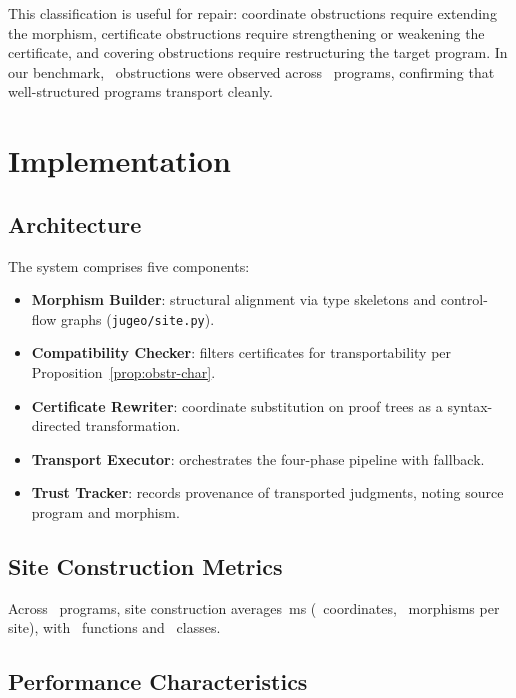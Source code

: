 \documentclass[11pt]{article}
\begin{document}
This classification is useful for repair: coordinate obstructions
require extending the morphism, certificate obstructions require
strengthening or weakening the certificate, and covering obstructions
require restructuring the target program.  In our benchmark,
\compObstructionTotal\ obstructions were observed across
\compTotalPrograms\ programs, confirming that well-structured
programs transport cleanly.

\section{Implementation}\label{sec:implementation}

\subsection{Architecture}
The system comprises five components:
\begin{itemize}[noitemsep]
  \item \textbf{Morphism Builder}: structural alignment via type
        skeletons and control-flow graphs (\texttt{jugeo/site.py}).
  \item \textbf{Compatibility Checker}: filters certificates for
        transportability per Proposition~\ref{prop:obstr-char}.
  \item \textbf{Certificate Rewriter}: coordinate substitution on
        proof trees as a syntax-directed transformation.
  \item \textbf{Transport Executor}: orchestrates the four-phase
        pipeline with fallback.
  \item \textbf{Trust Tracker}: records provenance of transported
        judgments, noting source program and morphism.
\end{itemize}

\subsection{Site Construction Metrics}
Across \compSiteTotalBuilt\ programs, site construction averages
\compSiteMeanBuildMs\,ms (\compSiteMeanCoords\ coordinates,
\compSiteMeanMorphisms\ morphisms per site), with
\compSiteTotalFunctions\ functions and \compSiteTotalClasses\ classes.

\subsection{Performance Characteristics}
\end{document}
